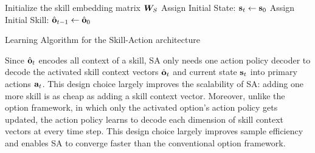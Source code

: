 \begin{algorithm}[htb]
\SetAlgoLined
  Initialize the skill embedding matrix ${\bm{W}}_S$\;
  Assign Initial State: ${\mathbf{s}}_t\leftarrow {\mathbf{s}}_0$\;
  Assign Initial Skill: $\hat{{\mathbf{o}}}_{t-1}\leftarrow \hat{{\mathbf{o}}}_0$\;
  \;
  
\caption{\label{alg:sa} Learning Algorithm for the Skill-Action
  architecture}
\end{algorithm}

Since $\hat{{\mathbf{o}}}_t$ encodes all context of a skill, SA only
needs one action policy decoder to decode the activated skill
context vectors $\hat{{\mathbf{o}}}_t$ and current state ${\mathbf{s}}_t$ into
primary actions ${\mathbf{a}}_t$. This design choice largely improves the
scalability of SA: adding one more skill is as cheap as adding a
skill context vector. Moreover, unlike the option framework, in
which only the activated option's action policy gets updated, the
action policy learns to decode each dimension of skill context
vectors at every time step. This design choice largely improves
sample efficiency and enables SA to converge faster than the
conventional option framework.

